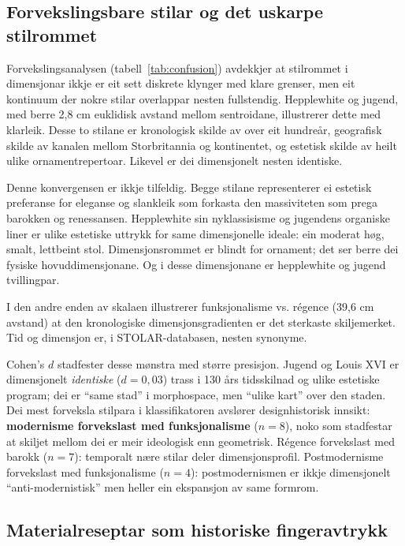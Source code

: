 \documentclass[10pt, a4paper, twocolumn]{article}
\begin{document}
\subsection{Forvekslingsbare stilar og det uskarpe stilrommet}

Forvekslingsanalysen (tabell~\ref{tab:confusion}) avdekkjer at stilrommet i dimensjonar ikkje er eit sett diskrete klynger med klare grenser, men eit kontinuum der nokre stilar overlappar nesten fullstendig. Hepplewhite og jugend, med berre 2,8 cm euklidisk avstand mellom sentroidane, illustrerer dette med klarleik. Desse to stilane er kronologisk skilde av over eit hundreår, geografisk skilde av kanalen mellom Storbritannia og kontinentet, og estetisk skilde av heilt ulike ornamentrepertoar. Likevel er dei dimensjonelt nesten identiske.

Denne konvergensen er ikkje tilfeldig. Begge stilane representerer ei estetisk preferanse for eleganse og slankleik som forkasta den massiviteten som prega barokken og renessansen. Hepplewhite sin nyklassisisme og jugendens organiske liner er ulike estetiske uttrykk for same dimensjonelle ideale: ein moderat høg, smalt, lettbeint stol. Dimensjonsrommet er blindt for ornament; det ser berre dei fysiske hovuddimensjonane. Og i desse dimensjonane er hepplewhite og jugend tvillingpar.

I den andre enden av skalaen illustrerer funksjonalisme vs. régence (39,6 cm avstand) at den kronologiske dimensjonsgradienten er det sterkaste skiljemerket. Tid og dimensjon er, i STOLAR-databasen, nesten synonyme.

Cohen's $d$ stadfester desse mønstra med større presisjon. Jugend og Louis XVI er dimensjonelt \emph{identiske} ($d = 0{,}03$) trass i 130 års tidsskilnad og ulike estetiske program; dei er ``same stad'' i morphospace, men ``ulike kart'' over den staden. Dei mest forveksla stilpara i klassifikatoren avslører designhistorisk innsikt: \textbf{modernisme forvekslast med funksjonalisme} ($n = 8$), noko som stadfestar at skiljet mellom dei er meir ideologisk enn geometrisk. Régence forvekslast med barokk ($n = 7$): temporalt nære stilar deler dimensjonsprofil. Postmodernisme forvekslast med funksjonalisme ($n = 4$): postmodernismen er ikkje dimensjonelt ``anti-modernistisk'' men heller ein ekspansjon av same formrom.


\subsection{Materialreseptar som historiske fingeravtrykk}
\end{document}
